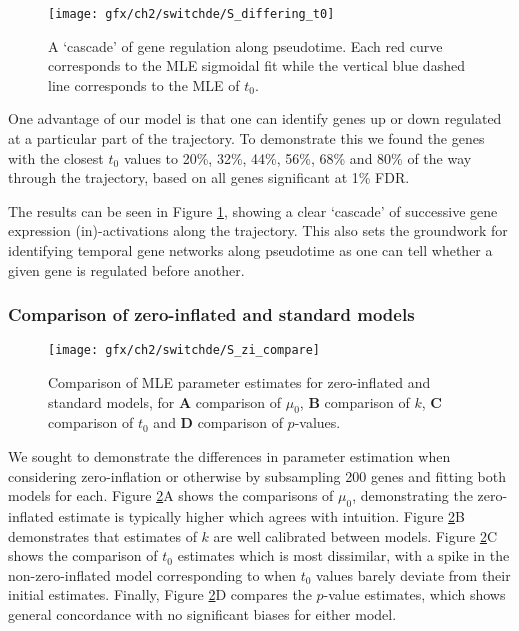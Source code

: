 \begin{figure}[h]%
\centering
\texttt{[image: gfx/ch2/switchde/S\_differing\_t0]}
\caption[A `cascade' of gene regulation along pseudotime.]{A `cascade' of gene regulation along pseudotime. Each red curve corresponds to the MLE sigmoidal fit while the vertical blue dashed line corresponds to the MLE of $t_0$.}\label{fig:S3}
\end{figure}

One advantage of our model is that one can identify genes up or down regulated at a particular part of the trajectory. To demonstrate this we found the genes with the closest $t_0$ values to 20\%, 32\%, 44\%, 56\%, 68\% and 80\% of the way through the trajectory, based on all genes significant at 1\% FDR.

The results can be seen in Figure \ref{fig:S3}, showing a clear `cascade' of successive gene expression (in)-activations along the trajectory. This also sets the groundwork for identifying temporal gene networks along pseudotime as one can tell whether a given gene is regulated before another.


\subsubsection{Comparison of zero-inflated and standard models}

\begin{figure}[!h]%
\centering
\texttt{[image: gfx/ch2/switchde/S\_zi\_compare]}
\caption[Comparison of MLE parameter estimates for zero-inflated and standard models.]{Comparison of MLE parameter estimates for zero-inflated and standard models, for \textbf{A} comparison of $\mu_0$, \textbf{B} comparison of $k$, \textbf{C} comparison of $t_0$ and \textbf{D} comparison of $p$-values.}\label{fig:S4}
\end{figure}


We sought to demonstrate the differences in parameter estimation when considering zero-inflation or otherwise by subsampling 200 genes and fitting both models for each. Figure \ref{fig:S4}A shows the comparisons of $\mu_0$, demonstrating the zero-inflated estimate is typically higher which agrees with intuition. Figure \ref{fig:S4}B demonstrates that estimates of $k$ are well calibrated between models. Figure \ref{fig:S4}C shows the comparison of $t_0$ estimates which is most dissimilar, with a spike in the non-zero-inflated model corresponding to when $t_0$ values barely deviate from their initial estimates. Finally, Figure \ref{fig:S4}D compares the $p$-value estimates, which shows general concordance with no significant biases for either model.


